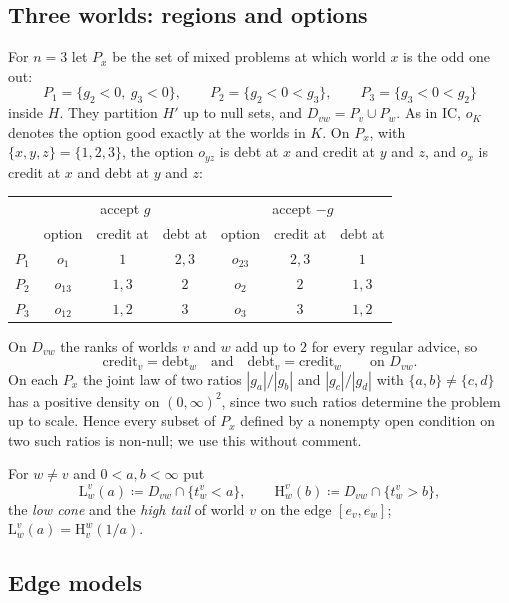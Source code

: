 \documentclass[11pt]{article}
\theoremstyle{definition}\newtheorem{definition}[theorem]{Definition}
\theoremstyle{remark}\newtheorem{remark}[theorem]{Remark}
\newcommand{\debt}{\mathrm{debt}}
\newcommand{\cred}{\mathrm{credit}}
\newcommand{\Lo}[3]{\mathrm L^{#1}_{#2}(#3)}
\newcommand{\Hi}[3]{\mathrm H^{#1}_{#2}(#3)}
\begin{document}
\subsection{Three worlds: regions and options}\label{sec:regions}

For $n=3$ let $P_x$ be the set of mixed problems at which world $x$ is the
odd one out:
\[
 P_1=\{g_2<0,\ g_3<0\},\qquad P_2=\{g_2<0<g_3\},\qquad P_3=\{g_3<0<g_2\}
\]
inside $H$. They partition $H'$ up to null sets, and $D_{vw}=P_v\cup P_w$.
As in IC, $o_K$ denotes the option good exactly at the worlds in $K$. On
$P_x$, with $\{x,y,z\}=\{1,2,3\}$, the option $o_{yz}$ is debt at $x$ and
credit at $y$ and $z$, and $o_x$ is credit at $x$ and debt at $y$ and $z$:
\begin{center}
\begin{tabular}{c|ccc|ccc}
 & \multicolumn{3}{c|}{accept $g$} & \multicolumn{3}{c}{accept $-g$}\\
 & option & credit at & debt at & option & credit at & debt at\\\hline
$P_1$ & $o_1$ & $1$ & $2,3$ & $o_{23}$ & $2,3$ & $1$\\
$P_2$ & $o_{13}$ & $1,3$ & $2$ & $o_2$ & $2$ & $1,3$\\
$P_3$ & $o_{12}$ & $1,2$ & $3$ & $o_3$ & $3$ & $1,2$
\end{tabular}
\end{center}
On $D_{vw}$ the ranks of worlds $v$ and $w$ add up to $2$ for every regular
advice, so
\begin{equation}
 \cred_v=\debt_w\quad\text{and}\quad\debt_v=\cred_w\qquad\text{on }D_{vw}.
 \label{eq:swap}
\end{equation}
On each $P_x$ the joint law of two ratios $|g_a|/|g_b|$ and $|g_c|/|g_d|$
with $\{a,b\}\ne\{c,d\}$ has a positive density on $(0,\infty)^2$, since two
such ratios determine the problem up to scale. Hence every subset of $P_x$ defined by a nonempty open
condition on two such ratios is non-null; we use this without comment.

For $w\ne v$ and $0<a,b<\infty$ put
\[
 \Lo vwa\coloneqq D_{vw}\cap\{t^v_w<a\},\qquad
 \Hi vwb\coloneqq D_{vw}\cap\{t^v_w>b\},
\]
the \emph{low cone} and the \emph{high tail} of world $v$ on the edge
$[e_v,e_w]$; $\Lo vwa=\Hi wv{1/a}$.

\subsection{Edge models}\label{sec:edgemodels}
\end{document}
